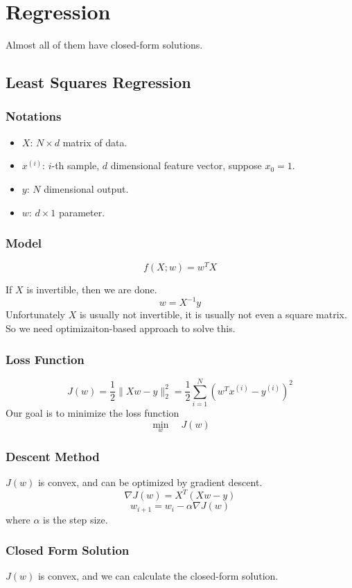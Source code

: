 \chapter{Regression}
Almost all of them have closed-form solutions.
\newpage
\section{Least Squares Regression}
\subsection{Notations}
\begin{itemize}
    \item $X$: $N \times d$ matrix of data.
    \item $x^{(i)}$: $i$-th sample, $d$ dimensional feature vector, suppose $x_0 = 1$.
    \item $y$: $N$ dimensional output.
    \item  $w$: $d \times 1$ parameter.
\end{itemize}
\subsection{Model}
\[ f(X;w) = w^T X \]
\begin{remark}
    If $X$ is invertible, then we are done.
    \[ w = X^{-1}y \]
    Unfortunately $X$ is usually not invertible, it is usually not even a square matrix. So we need optimizaiton-based approach to solve this.
\end{remark}
\subsection{Loss Function}\label{section:LeastSquareLossFunc}
\[ J(w)  = \frac{1}{2}\| Xw - y \|_2^2 = \frac{1}{2}\sum_{i=1}^N(w^Tx^{(i)} - y^{(i)})^2 \]
Our goal is to minimize the loss function
\[ \min_w \quad J(w) \]
\subsection{Descent Method}
$J(w)$ is convex, and can be optimized by gradient descent.
\[ \nabla J(w) = X^T(Xw-y) \]
\[ w_{i+1} = w_i - \alpha \nabla J(w) \]
where $\alpha$ is the step size.
\subsection{Closed Form Solution}
$J(w)$ is convex, and we can calculate the closed-form solution.

